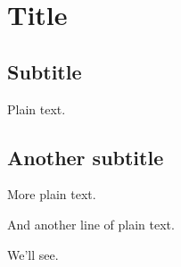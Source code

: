 \documentclass{article}
\begin{document}
\section{Title}

\subsection{Subtitle}

Plain text.

\subsection{Another subtitle}

More plain text.

And another line of plain text.

We'll see.
\end{document}
